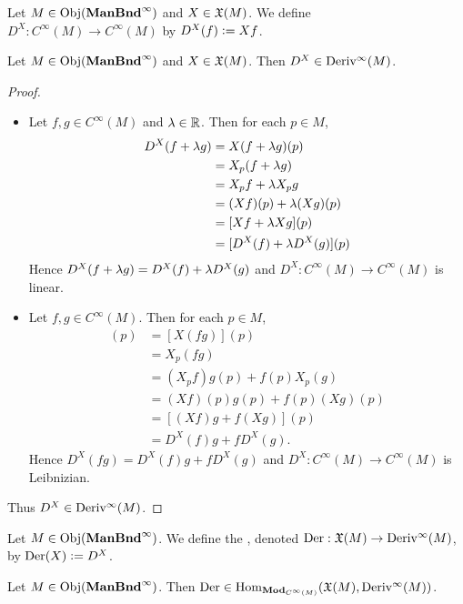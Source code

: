 \documentclass{book}
\begin{document}
\begin{defn}
	Let $M \in \operatorname{Obj}(\operatorname*{\text{\textbf{ManBnd}}^{\infty}})$ and $X \in \mathfrak{X}(M)$. We define $D^X: C^{\infty}(M) \rightarrow C^{\infty}(M)$ by $D^X(f) \vcentcolon= Xf$.
\end{defn}

\begin{ex}
	Let $M \in \operatorname{Obj}(\operatorname*{\text{\textbf{ManBnd}}^{\infty}})$ and $X \in \mathfrak{X}(M)$. Then $D^X \in \operatorname{Deriv^{\infty}}(M)$.
\end{ex}

\begin{proof}\
	\begin{itemize}
		\item Let $f, g \in C^{\infty}(M)$ and $\lambda \in \mathbb{R}$. Then for each $p \in M$,
		\begin{align*}
			D^X(f + \lambda g)
			& = X(f + \lambda g)(p) \\
			& = X_p(f+ \lambda g) \\
			& = X_pf + \lambda X_p g \\
			& = (Xf)(p) + \lambda (Xg)(p) \\
			& = [Xf + \lambda Xg](p) \\
			& = [D^X(f) + \lambda D^X(g)](p)
		\end{align*}
		Hence $D^X(f + \lambda g) = D^X(f) + \lambda D^X(g)$ and $D^X: C^{\infty}(M) \rightarrow C^{\infty}(M)$ is linear.
		\item Let $f,g \in C^{\infty}(M)$. Then for each $p \in M$,
		\begin{align*}
			[D^X(fg)](p)
			& = [X(fg)](p) \\
			& = X_p(fg) \\
			& = (X_pf)g(p) + f(p)X_p(g) \\
			& = (Xf)(p)g(p) + f(p)(Xg)(p) \\
			& = [(Xf)g + f(Xg)](p) \\
			& = D^X(f)g + fD^X(g).
		\end{align*}
		Hence $D^X(fg) = D^X(f)g + fD^X(g)$ and $D^X: C^{\infty}(M) \rightarrow C^{\infty}(M)$ is Leibnizian. 
	\end{itemize}
	Thus $D^X \in \operatorname{Deriv^{\infty}}(M)$.
\end{proof}

\begin{defn}
	Let $M \in \operatorname{Obj}(\operatorname*{\text{\textbf{ManBnd}}^{\infty}})$. We define the , denoted $\text{Der}:\mathfrak{X}(M) \rightarrow \operatorname{Deriv^{\infty}}(M)$, by $\text{Der}(X) \vcentcolon= D^X$.
\end{defn}

\begin{ex}
	Let $M \in \operatorname{Obj}(\operatorname*{\text{\textbf{ManBnd}}^{\infty}})$. Then $\text{Der} \in \operatorname{Hom}_{\operatorname*{\text{\textbf{Mod}}}_{C^{\infty}(M)}}(\mathfrak{X}(M), \operatorname{Deriv^{\infty}}(M))$.
\end{ex}
\end{document}
